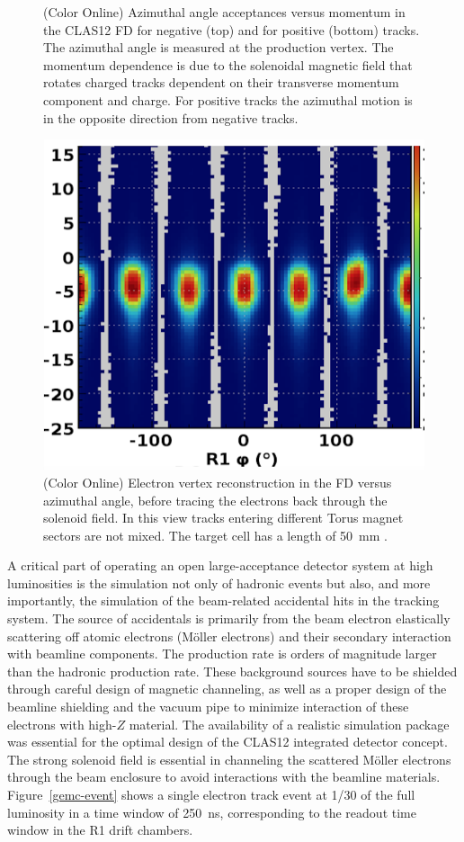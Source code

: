 \documentclass[final,3p,twocolumn]{elsarticle}
\begin{document}
\begin{figure}[t!]
\caption{(Color Online) Azimuthal angle acceptances versus momentum in the CLAS12 FD for negative (top) and for 
positive (bottom) tracks. The azimuthal angle is measured at the production vertex. The momentum dependence 
is due to the solenoidal magnetic field that rotates charged tracks dependent on their transverse momentum component and charge.
For positive tracks the azimuthal motion is in the opposite direction from negative tracks.} 
\label{neg-pos}
\end{figure}

\begin{figure} 
\includegraphics[width=0.9\columnwidth]{R1-vertex.png}
\caption{(Color Online) Electron vertex reconstruction in the FD versus azimuthal angle, before tracing the electrons 
back through the solenoid field. In this view tracks entering different Torus magnet sectors are not mixed. The target cell 
has a length of 50~mm .} 
\label{vertex}
\end{figure}

A critical part of operating an open large-acceptance detector system at high luminosities is the simulation not only of
hadronic events but also, and more importantly, the simulation of the beam-related accidental hits in the tracking system.
The source of accidentals is primarily from the beam electron elastically scattering off atomic electrons (M{\"o}ller
electrons) and their secondary interaction with beamline components. The production rate is orders of magnitude larger
than the hadronic production rate. These background sources have to be shielded through careful design of magnetic
channeling, as well as a proper design of the beamline shielding and the vacuum pipe to minimize interaction of these
electrons with high-$Z$ material. The availability of a realistic simulation package was essential for the optimal design
of the CLAS12 integrated detector concept. The strong solenoid field is essential in channeling the scattered M{\"o}ller
electrons through the beam enclosure to avoid interactions with the beamline materials. Figure~\ref{gemc-event}  shows
a single electron track event at 1/30 of the full luminosity in a time window of 250~ns, corresponding to the readout time
window in the R1 drift chambers. 
 
\end{document}
